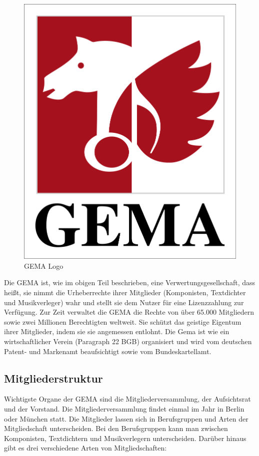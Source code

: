 \begin{figure}[H] 
\centering 
\includegraphics[scale=0.15]{se-wa-jpg/gema} 
\caption[GEMA Logo]{GEMA Logo} 
\label{gema_logo} 
\end{figure}

Die GEMA ist, wie im obigen Teil beschrieben, eine Verwertungsgesellschaft, dass heißt, sie nimmt die Urheberrechte ihrer Mitglieder (Komponisten, Textdichter und Musikverleger) wahr und stellt sie dem Nutzer für eine Lizenzzahlung zur Verfügung. Zur Zeit verwaltet die GEMA die Rechte von über 65.000 Mitgliedern sowie zwei Millionen Berechtigten weltweit. Sie schützt das geistige Eigentum ihrer Mitglieder, indem sie sie angemessen entlohnt. Die Gema ist wie ein wirtschaftlicher Verein (Paragraph 22 BGB) organisiert und wird vom deutschen Patent- und Markenamt beaufsichtigt sowie vom Bundeskartellamt.
\newline
\subsection{Mitgliederstruktur}
\label{mitlgiederstruktur}
Wichtigste Organe der GEMA sind die Mitgliederversammlung, der Aufsichtsrat und der Vorstand. Die Mitgliederversammlung findet einmal im Jahr in Berlin oder München statt. Die Mitglieder lassen sich in Berufsgruppen und Arten der Mitgliedschaft unterscheiden. Bei den Berufsgruppen kann man zwischen Komponisten, Textdichtern und Musikverlegern unterscheiden. Darüber hinaus gibt es drei verschiedene Arten von Mitgliedschaften:
\newpage

